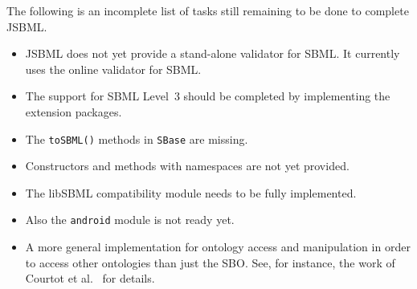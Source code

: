 The following is an incomplete list of tasks still remaining to be done to
complete JSBML.

\begin{itemize}

\item JSBML does not yet provide a stand-alone validator for SBML. It
  currently uses the online validator for SBML.

\item The support for SBML Level~3 should be completed
  by implementing the extension packages.

\item The \texttt{toSBML()}
  methods in \texttt{SBase} are missing.

\item Constructors and methods with namespaces are not yet provided.

\item The libSBML compatibility module
  needs to be fully implemented.

\item Also the \texttt{android} module is not ready yet.

\item A more general implementation for ontology access and manipulation in
  order to access other ontologies than just the SBO. See, for instance,
  the work of Courtot et al.~\cite{Courtot2011a} for details.

\end{itemize}

